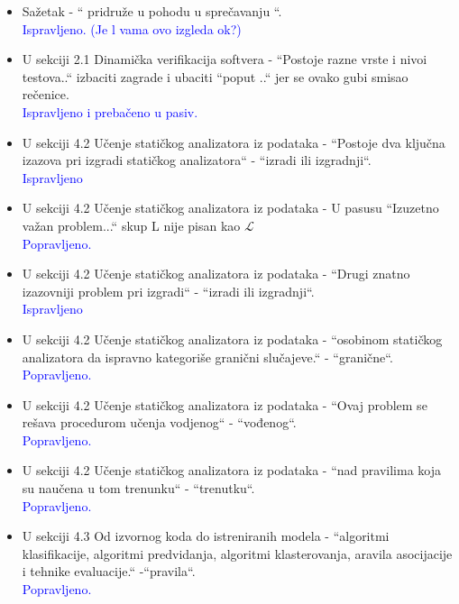 \documentclass[a4paper]{report}
\newcommand{\odgovor}[1]{\textcolor{blue}{#1}}
\begin{document}
\begin{itemize}
   \item Sažetak - `` pridruže u pohodu u sprečavanju ``.
   \\\odgovor{Ispravljeno. (Je l vama ovo izgleda ok?)}

   \item U sekciji 2.1 Dinamička verifikacija softvera - ``Postoje razne vrste i nivoi testova..`` izbaciti zagrade i ubaciti ``poput ..`` jer se ovako gubi smisao rečenice.
   \\\odgovor{Ispravljeno i prebačeno u pasiv.}

   \item U sekciji 4.2 Učenje statičkog analizatora iz podataka - ``Postoje dva ključna izazova pri izgradi statičkog analizatora`` - ``izradi ili izgradnji``.
   \\\odgovor{Ispravljeno}

   \item U sekciji 4.2 Učenje statičkog analizatora iz podataka - U pasusu ``Izuzetno važan problem...`` skup L nije pisan kao $\mathcal{L}$
   \\\odgovor{Popravljeno.}

   \item U sekciji 4.2 Učenje statičkog analizatora iz podataka - ``Drugi znatno izazovniji problem pri izgradi`` - ``izradi ili izgradnji``.
   \\\odgovor{Ispravljeno}

   \item U sekciji 4.2 Učenje statičkog analizatora iz podataka - ``osobinom statičkog analizatora da ispravno kategoriše granični slučajeve.`` - ``granične``.
   \\\odgovor{Popravljeno.}

   \item U sekciji 4.2 Učenje statičkog analizatora iz podataka - ``Ovaj problem se rešava procedurom učenja vodjenog`` - ``vođenog``.
   \\\odgovor{Popravljeno.}

   \item U sekciji 4.2 Učenje statičkog analizatora iz podataka - ``nad pravilima koja su naučena u tom trenunku`` - ``trenutku``.
   \\\odgovor{Popravljeno.}

   \item U sekciji 4.3 Od izvornog koda do istreniranih modela - ``algoritmi klasifikacije, algoritmi predvidanja, algoritmi klasterovanja, aravila asocijacije i tehnike evaluacije.`` -``pravila``.
   \\\odgovor{Popravljeno.}


\end{itemize}
\end{document}

